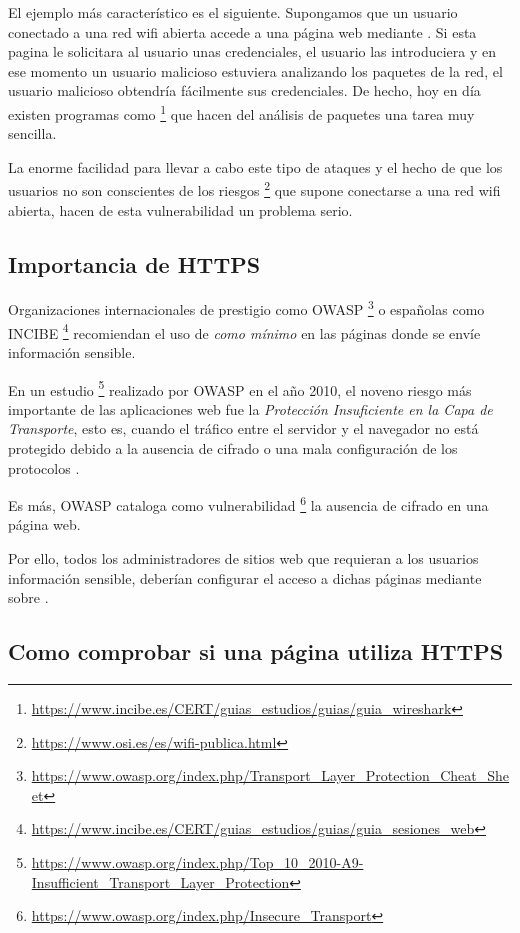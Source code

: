 El ejemplo más característico es el siguiente. Supongamos que un usuario conectado a una red wifi abierta accede a una página web mediante . Si esta pagina le solicitara al usuario unas credenciales, el usuario las introduciera  y en ese momento un usuario malicioso estuviera analizando los paquetes de la red, el usuario malicioso obtendría fácilmente sus credenciales. De hecho, hoy en día existen programas como  \footnote{\url{https://www.incibe.es/CERT/guias_estudios/guias/guia_wireshark}} que hacen del análisis de paquetes una tarea muy sencilla.

La enorme facilidad para llevar a cabo este tipo de ataques y el hecho de que los usuarios no son conscientes de los riesgos \footnote{\url{https://www.osi.es/es/wifi-publica.html}} que supone conectarse a una red wifi abierta, hacen de esta vulnerabilidad un problema serio.

\subsection{Importancia de HTTPS}
\label{sub:Importancia de HTTPS}

Organizaciones internacionales de prestigio como OWASP  \footnote{\url{https://www.owasp.org/index.php/Transport_Layer_Protection_Cheat_Sheet}} o españolas como INCIBE \footnote{\url{https://www.incibe.es/CERT/guias_estudios/guias/guia_sesiones_web}} recomiendan el uso de  \emph{como mínimo} en las páginas donde se envíe información sensible.

En un estudio \footnote{\url{https://www.owasp.org/index.php/Top_10_2010-A9-Insufficient_Transport_Layer_Protection}} realizado por OWASP en el año 2010, el noveno riesgo más importante de las aplicaciones web fue la \emph{Protección Insuficiente en la Capa de Transporte}, esto es, cuando el tráfico entre el servidor y el navegador no está protegido debido a la ausencia de cifrado o una mala configuración de los protocolos .

Es más, OWASP cataloga como vulnerabilidad \footnote{\url{https://www.owasp.org/index.php/Insecure_Transport}} la ausencia de cifrado en una página web.

Por ello, todos los administradores de sitios web que requieran a los usuarios información sensible, deberían configurar el acceso a dichas páginas mediante  sobre .

\subsection{Como comprobar si una página utiliza HTTPS}
\label{sub:Como comprobar si una página utiliza HTTPS}

